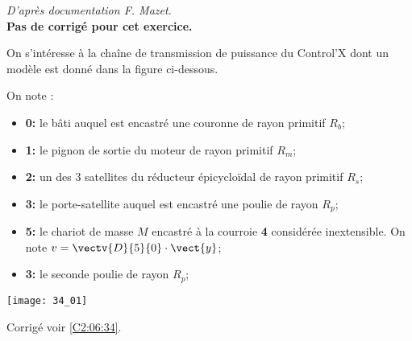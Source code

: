 \normaltrue \difficilefalse \tdifficilefalse
\correctionfalse
\renewcommand{\UPSTIidClasse}{12}

\textit{D'après documentation F. Mazet.} \\
\setcounter{numques}{0}
\ifcorrection
\else
\textbf{Pas de corrigé pour cet exercice.}
\fi

\ifprof
\else
On s'intéresse à la chaîne de transmission de puissance du Control'X dont un modèle est donné dans la figure ci-dessous.

On note : 
\begin{itemize}
\item \textbf{0:} le bâti auquel est encastré une couronne de rayon primitif $R_b$;
\item \textbf{1:} le pignon de sortie du moteur de rayon primitif $R_m$;
\item \textbf{2:} un des 3 satellites du réducteur épicycloïdal de rayon primitif $R_s$;
\item \textbf{3:} le porte-satellite auquel est encastré une poulie de rayon $R_p$;
\item \textbf{5:} le chariot de masse $M$ encastré à la courroie \textbf{4} considérée inextensible. On note $v=\vectv{D}{5}{0}\cdot \vect{y}$;
\item \textbf{3:} le seconde poulie de rayon $R_p$;
\end{itemize}


\begin{center}
\texttt{[image: 34\_01]}
\end{center}
\fi


\ifprof
\else
\fi



\ifprof
\else
\begin{flushright}
\footnotesize{Corrigé  voir \ref{C2:06:34}.}
\end{flushright}%
\fi